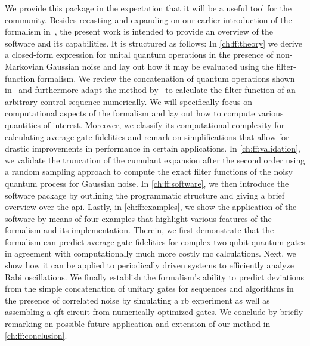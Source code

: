 We provide this package in the expectation that it will be a useful tool for the community.
Besides recasting and expanding on our earlier introduction of the formalism in~, the present work is intended to provide an overview of the software and its capabilities.
It is structured as follows: In \cref{ch:ff:theory} we derive a closed-form expression for unital quantum operations in the presence of non-Markovian Gaussian noise and lay out how it may be evaluated using the filter-function formalism.
We review the concatenation of quantum operations shown in~ and furthermore adapt the method by~\citet{Green2013} to calculate the filter function of an arbitrary control sequence numerically.
We will specifically focus on computational aspects of the formalism and lay out how to compute various quantities of interest.
Moreover, we classify its computational complexity for calculating average gate fidelities and remark on simplifications that allow for drastic improvements in performance in certain applications.
In \cref{ch:ff:validation}, we validate the truncation of the cumulant expansion after the second order using a random sampling approach to compute the exact filter functions of the noisy quantum process for Gaussian noise.
In \cref{ch:ff:software}, we then introduce the \filterfunctions software package by outlining the programmatic structure and giving a brief overview over the \gls{api}.
Lastly, in \cref{ch:ff:examples}, we show the application of the software by means of four examples that highlight various features of the formalism and its implementation.
Therein, we first demonstrate that the formalism can predict average gate fidelities for complex two-qubit quantum gates in agreement with computationally much more costly \gls{mc} calculations.
Next, we show how it can be applied to periodically driven systems to efficiently analyze Rabi oscillations.
We finally establish the formalism's ability to predict deviations from the simple concatenation of unitary gates for sequences and algorithms in the presence of correlated noise by simulating a \gls{rb} experiment as well as assembling a \gls{qft} circuit from numerically optimized gates.
We conclude by briefly remarking on possible future application and extension of our method in \cref{ch:ff:conclusion}.

